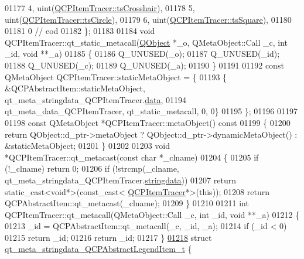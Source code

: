 \begin{DoxyCode}
01177        4, uint(\hyperlink{a00042_a2f05ddb13978036f902ca3ab47076500af562ec81ac3ba99e26ef8540cf1ec16f}{QCPItemTracer::tsCrosshair}),
01178        5, uint(\hyperlink{a00042_a2f05ddb13978036f902ca3ab47076500ae2252c28f4842880d71e9f94e69de94e}{QCPItemTracer::tsCircle}),
01179        6, uint(\hyperlink{a00042_a2f05ddb13978036f902ca3ab47076500a4ed5f01f2c5fd86d980366d79f481b9b}{QCPItemTracer::tsSquare}),
01180 
01181        0        \textcolor{comment}{// eod}
01182 \};
01183 
01184 \textcolor{keywordtype}{void} QCPItemTracer::qt\_static\_metacall(\hyperlink{a00059}{QObject} *\_o, QMetaObject::Call \_c, \textcolor{keywordtype}{int} \_id, \textcolor{keywordtype}{void} **\_a)
01185 \{
01186     Q\_UNUSED(\_o);
01187     Q\_UNUSED(\_id);
01188     Q\_UNUSED(\_c);
01189     Q\_UNUSED(\_a);
01190 \}
01191 
01192 \textcolor{keyword}{const} QMetaObject QCPItemTracer::staticMetaObject = \{
01193     \{ &QCPAbstractItem::staticMetaObject, qt\_meta\_stringdata\_QCPItemTracer.\hyperlink{a00067_a87c91fdce2044ef334c2cfd91e38ac00}{data},
01194       qt\_meta\_data\_QCPItemTracer,  qt\_static\_metacall, 0, 0\}
01195 \};
01196 
01197 
01198 \textcolor{keyword}{const} QMetaObject *QCPItemTracer::metaObject()\textcolor{keyword}{ const}
01199 \textcolor{keyword}{}\{
01200     \textcolor{keywordflow}{return} QObject::d\_ptr->metaObject ? QObject::d\_ptr->dynamicMetaObject() : &staticMetaObject;
01201 \}
01202 
01203 \textcolor{keywordtype}{void} *QCPItemTracer::qt\_metacast(\textcolor{keyword}{const} \textcolor{keywordtype}{char} *\_clname)
01204 \{
01205     \textcolor{keywordflow}{if} (!\_clname) \textcolor{keywordflow}{return} 0;
01206     \textcolor{keywordflow}{if} (!strcmp(\_clname, qt\_meta\_stringdata\_QCPItemTracer.\hyperlink{a00067_a28c4c1cde887cbe6b6af18ce9d6ed867}{stringdata}))
01207         \textcolor{keywordflow}{return} \textcolor{keyword}{static\_cast<}\textcolor{keywordtype}{void}*\textcolor{keyword}{>}(\textcolor{keyword}{const\_cast<} \hyperlink{a00042}{QCPItemTracer}*\textcolor{keyword}{>}(\textcolor{keyword}{this}));
01208     \textcolor{keywordflow}{return} QCPAbstractItem::qt\_metacast(\_clname);
01209 \}
01210 
01211 \textcolor{keywordtype}{int} QCPItemTracer::qt\_metacall(QMetaObject::Call \_c, \textcolor{keywordtype}{int} \_id, \textcolor{keywordtype}{void} **\_a)
01212 \{
01213     \_id = QCPAbstractItem::qt\_metacall(\_c, \_id, \_a);
01214     \textcolor{keywordflow}{if} (\_id < 0)
01215         \textcolor{keywordflow}{return} \_id;
01216     \textcolor{keywordflow}{return} \_id;
01217 \}
\hypertarget{a00067_source_l01218}{}\hyperlink{a00067}{01218} \textcolor{keyword}{struct }\hyperlink{a00067_d9/dd0/a00191}{qt\_meta\_stringdata\_QCPAbstractLegendItem\_t} \{

\end{DoxyCode}

